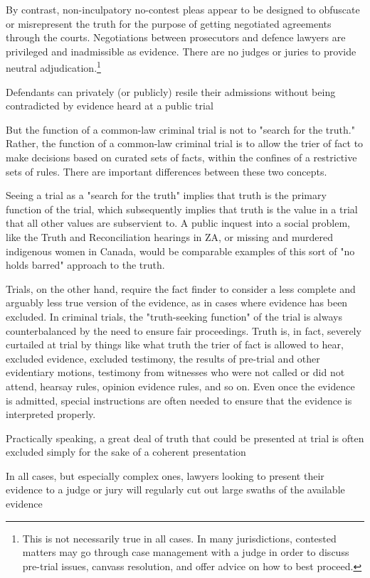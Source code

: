 By contrast, non-inculpatory no-contest pleas appear to be designed to obfuscate or misrepresent the truth for the purpose of getting negotiated agreements through the courts. Negotiations between prosecutors and defence lawyers are privileged and inadmissible as evidence. There are no judges or juries to provide neutral adjudication.\footnote{This is not necessarily true in all cases. In many jurisdictions, contested matters may go through case management with a judge in order to discuss pre-trial issues, canvass resolution, and offer advice on how to best proceed. }

Defendants can privately (or publicly) resile their admissions without being contradicted by evidence heard at a public trial

But the function of a common-law criminal trial is not to "search for the truth." Rather, the function of a common-law criminal trial is to allow the trier of fact to make decisions based on curated sets of facts, within the confines of a restrictive sets of rules. There are important differences between these two concepts. 

Seeing a trial as a "search for the truth" implies that truth is the primary function of the trial, which subsequently implies that truth is the value in a trial that all other values are subservient to. A public inquest into a social problem, like the Truth and Reconciliation hearings in ZA, or missing and murdered indigenous women in Canada, would be comparable examples of this sort of "no holds barred" approach to the truth. 

Trials, on the other hand, require the fact finder to consider a less complete and arguably less true version of the evidence, as in cases where evidence has been excluded. In criminal trials, the "truth-seeking function" of the trial is always counterbalanced by the need to ensure fair proceedings. Truth is, in fact, severely curtailed at trial by things like what truth the trier of fact is allowed to hear, excluded evidence, excluded testimony, the results of pre-trial and other evidentiary motions, testimony from witnesses who were not called or did not attend, hearsay rules, opinion evidence rules, and so on. Even once the evidence is admitted, special instructions are often needed to ensure that the evidence is interpreted properly. 

Practically speaking, a great deal of truth that could be presented at trial is often excluded simply for the sake of a coherent presentation

In all cases, but especially complex ones, lawyers looking to present their evidence to a judge or jury will regularly cut out large swaths of the available evidence

